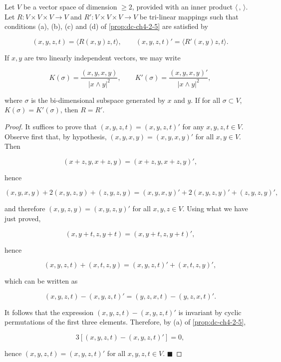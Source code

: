 \begin{lemma}
  \label{lem:dc-ch4-3-3}
  \leanok
  Let $V$ be a vector space of dimension $\geq 2$, provided with an inner product
  $\langle\,,\,\rangle$. Let $R:V\times V\times V\to V$ and $R':V\times V\times V\to V$
  be tri-linear mappings such that conditions (a), (b), (c) and (d) of \cref{prop:dc-ch4-2-5} are satisfied by
  
  $$
  (x,y,z,t)=\langle R(x,y)z,t\rangle,\qquad (x,y,z,t)'=\langle R'(x,y)z,t\rangle.
  $$
  
  If $x,y$ are two linearly independent vectors, we may write
  
  $$
  K(\sigma)=\frac{(x,y,x,y)}{|x\wedge y|^2},\qquad K'(\sigma)=\frac{(x,y,x,y)'}{|x\wedge y|^2},
  $$
  
  where $\sigma$ is the bi-dimensional subspace generated by $x$ and $y$. If for all
  $\sigma\subset V$, $K(\sigma)=K'(\sigma)$, then $R=R'$.
\end{lemma}
\begin{proof}
  \leanok
  It suffices to prove that $(x,y,z,t)=(x,y,z,t)'$ for any $x,y,z,t\in V$.
  Observe first that, by hypothesis, $(x,y,x,y)=(x,y,x,y)'$ for all $x,y\in V$. Then
  
  $$
  (x+z,y,x+z,y)=(x+z,y,x+z,y)',
  $$
  
  hence
  
  $$
  (x,y,x,y)+2(x,y,z,y)+(z,y,z,y)=(x,y,x,y)'+2(x,y,z,y)'+(z,y,z,y)',
  $$
  
  and therefore $(x,y,z,y)=(x,y,z,y)'$ for all $x,y,z\in V$. Using what we have just
  proved,
  
  $$
  (x,y+t,z,y+t)=(x,y+t,z,y+t)',
  $$
  
  hence
  
  $$
  (x,y,z,t)+(x,t,z,y)=(x,y,z,t)'+(x,t,z,y)',
  $$
  
  which can be written as
  
  $$
  (x,y,z,t)-(x,y,z,t)'=(y,z,x,t)-(y,z,x,t)'.
  $$
  
  It follows that the expression $(x,y,z,t)-(x,y,z,t)'$ is invariant by cyclic
  permutations of the first three elements. Therefore, by (a) of \cref{prop:dc-ch4-2-5},
  
  $$
  3[(x,y,z,t)-(x,y,z,t)']=0,
  $$
  
  hence $(x,y,z,t)=(x,y,z,t)'$ for all $x,y,z,t\in V$. $\blacksquare$
\end{proof}

